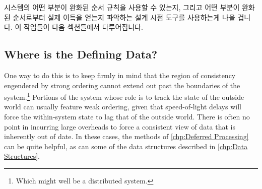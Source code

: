 \iffalse

One approach is to construct a strongly ordered system, then examine
its performance and scalablity.
If these suffice, the system is good and sufficient, and no more need
be done.
Otherwise, undertake careful analysis
(see \cref{sec:debugging:Performance Estimation})
and attack each bottleneck until the system's performance is good and
sufficient.

This approach can work very well, especially in contrast to the
all-too-common approach of optimizing random components of the system
in the hope of achieving significant system-wide benefits.
However, starting with strong ordering can also be quite wasteful,
given that weakening ordering of the system's bottleneck can require
that large portions of the rest of the system be redesigned and
rewritten to accommodate the weakening.
Worse yet, eliminating one bottleneck often exposes another, which
in turn needs to be weakened and which in turn can result in wholesale
redesigns and rewrites of other parts of the system.
Perhaps even worse is the approach, also common, of starting with a
fast but unreliable system and then playing whack-a-mole with an endless
succession of concurrency bugs, though in the latter case,
\cref{chp:Validation,chp:Formal Verification}
are always there for you.

\fi

시스템의 어떤 부분이 완화된 순서 규칙을 사용할 수 있는지, 그리고 어떤 부분이
완화된 순서로부터 실제 이득을 얻는지 파악하는 설계 시점 도구를 사용하는게 나을
겁니다.
이 작업들이 다음 섹션들에서 다루어집니다.

\iffalse

It would be better to have design-time tools to determine which portions
of the system could use weak ordering, and at the same time, which
portions actually benefit from weak ordering.
These tasks are taken up by the following sections.

\fi

\subsection{Where is the Defining Data?}
\label{sec:app:questions:Where is the Defining Data?}

One way to do this is to keep firmly in mind that the region of
consistency engendered by strong ordering cannot extend out past the
boundaries of the system.\footnote{
	Which might well be a distributed system.}
Portions of the system whose role is to track the state of the outside
world can usually feature weak ordering, given that speed-of-light delays
will force the within-system state to lag that of the outside world.
There is often no point in incurring large overheads to force a consistent
view of data that is inherently out of date.
In these cases, the methods of \cref{chp:Deferred Processing} can be
quite helpful, as can some of the data structures described in
\cref{chp:Data Structures}.

